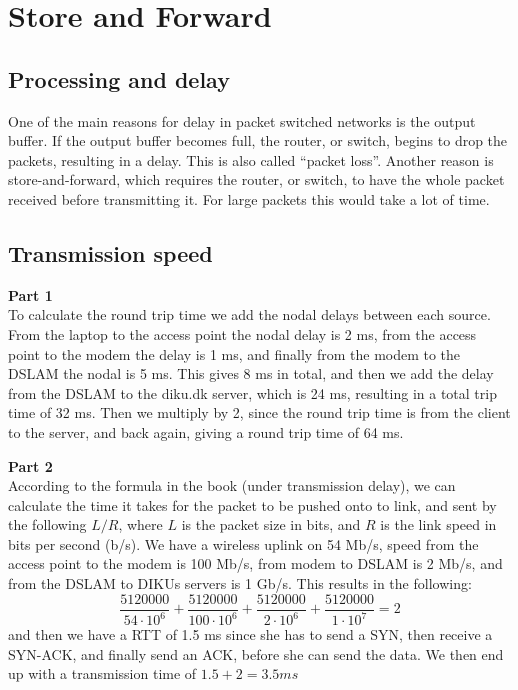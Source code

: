 \section{Store and Forward}
\subsection{Processing and delay}
One of the main reasons for delay in packet switched networks is the output
buffer. If the output buffer becomes full, the router, or switch, begins to drop
the packets, resulting in a delay. This is also called ``packet loss''. Another
reason is store-and-forward, which requires the router, or switch, to have the
whole packet received before transmitting it. For large packets this would take
a lot of time.

\subsection{Transmission speed}
\textbf{Part 1}\\
To calculate the round trip time we add the nodal delays between each source.
From the laptop to the access point the nodal delay is 2 ms, from the access
point to the modem the delay is 1 ms, and finally from the modem to the DSLAM
the nodal is 5 ms. This gives 8 ms in total, and then we add the delay from the
DSLAM to the diku.dk server, which is 24 ms, resulting in a total trip time of
32 ms. Then we multiply by 2, since the round trip time is from the client to
the server, and back again, giving a round trip time of 64 ms.

\noindent \textbf{Part 2}\\
According to the formula in the book (under transmission delay), we can
calculate the time it takes for the packet to be pushed onto to link, and sent
by the following $L/R$, where $L$ is the packet size in bits, and $R$ is the
link speed in bits per second (b/s). We have a wireless uplink on 54 Mb/s, speed
from the access point to the modem is 100 Mb/s, from modem to DSLAM is 2 Mb/s,
and from the DSLAM to DIKUs servers is 1 Gb/s.
This results in the following:
\[
\frac{5120000}{54 \cdot 10^6} + \frac{5120000}{100 \cdot 10^6} +
\frac{5120000}{2 \cdot 10^6} + \frac{5120000}{1 \cdot 10^7} = 2
\]
and then we have a RTT of 1.5 ms since she has to send a SYN, then receive a
SYN-ACK, and finally send an ACK, before she can send the data. We then end up
with a transmission time of $1.5 + 2 = 3.5 ms$